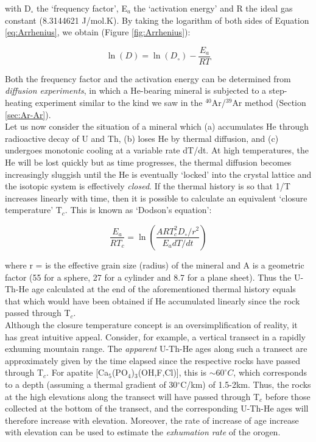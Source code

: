 \documentclass{book}
\begin{document}
with D$_\circ$ the `frequency factor', E$_a$ the `activation energy'
and R the ideal gas constant (8.3144621 J/mol.K). By taking the
logarithm of both sides of Equation \ref{eq:Arrhenius}, we obtain
(Figure \ref{fig:Arrhenius}):

\begin{equation}
\ln(D) = \ln(D_\circ) - \frac{E_a}{RT}
\label{eq:logD}
\end{equation}

Both the frequency factor and the activation energy can be determined
from \emph{diffusion experiments}, in which a He-bearing mineral is
subjected to a step-heating experiment similar to the kind we saw in
the $^{40}$Ar/$^{39}$Ar method (Section \ref{sec:Ar-Ar}).\\

Let us now consider the situation of a mineral which (a) accumulates
He through radioactive decay of U and Th, (b) loses He by thermal
diffusion, and (c) undergoes monotonic cooling at a variable rate
dT/dt. At high temperatures, the He will be lost quickly but as time
progresses, the thermal diffusion becomes increasingly sluggish until
the He is eventually `locked' into the crystal lattice and the isotopic
system is effectively \emph{closed}. If the thermal history is so that
1/T increases linearly with time, then it is possible to calculate an
equivalent `closure temperature' T$_c$. This is known as `Dodson's
equation':

\begin{equation}
\frac{E_a}{RT_c} = \ln\left(\frac{ART_c^2D_\circ/r^2}{E_adT/dt}\right)
\label{eq:Tc}
\end{equation}

where r = is the effective grain size (radius) of the mineral and A is
a geometric factor (55 for a sphere, 27 for a cylinder and 8.7 for a
plane sheet). Thus the U-Th-He age calculated at the end of the
aforementioned thermal history equals that which would have been
obtained if He accumulated linearly since the rock passed through
T$_c$.\\

Although the closure temperature concept is an oversimplification of
reality, it has great intuitive appeal. Consider, for example, a
vertical transect in a rapidly exhuming mountain range. The
\emph{apparent} U-Th-He ages along such a transect are approximately
given by the time elapsed since the respective rocks have passed
through T$_c$. For apatite [Ca$_5$(PO$_4$)$_3$(OH,F,Cl)], this is
$\sim 60^{\circ}C$, which corresponds to a depth (assuming a thermal
gradient of 30$^{\circ}$C/km) of 1.5-2km. Thus, the rocks at the high
elevations along the transect will have passed through T$_c$ before
those collected at the bottom of the transect, and the corresponding
U-Th-He ages will therefore increase with elevation. Moreover, the
rate of increase of age increase with elevation can be used to
estimate the \emph{exhumation rate} of the orogen.
\end{document}
